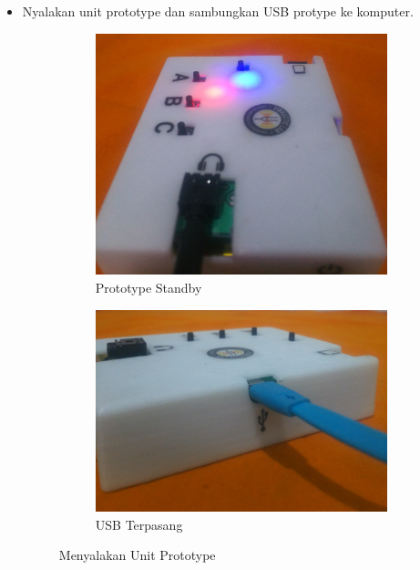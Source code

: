 \documentclass[12pt,]{article}
\begin{document}
	\begin{itemize}
		\item Nyalakan unit prototype dan sambungkan USB protype ke komputer.
		\begin{figure}[!ht]
			\centering
			\begin{subfigure}[b]{0.3\textwidth}
				\includegraphics[width=\textwidth]{images/foto/standby}
				\caption{Prototype Standby}
			\end{subfigure}
			\begin{subfigure}[b]{0.3\textwidth}
				\includegraphics[width=\textwidth]{images/foto/konek}
				\caption{USB Terpasang}
			\end{subfigure}
			\caption{Menyalakan Unit Prototype}
		\end{figure}



\end{itemize}
\end{document}
